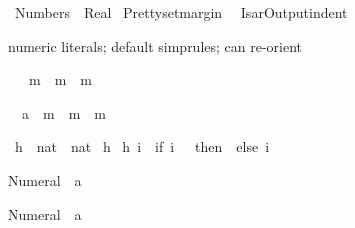 %
\begin{isabellebody}%
\def\isabellecontext{Numbers}%
\isanewline
{}\ Numbers\ {\isacharequal}\ Real{\isacharcolon}\isanewline
\isanewline
\isamarkupfalse%
\ {\isachardoublequote}Pretty{\isachardot}setmargin\ {}{}{\isachardoublequote}\isanewline
\isamarkupfalse%
\ {\isachardoublequote}IsarOutput{\isachardot}indent\ {\isacharcolon}{\isacharequal}\ {}{\isachardoublequote}\isamarkupfalse%
%
\begin{isamarkuptext}%
numeric literals; default simprules; can re-orient%
\end{isamarkuptext}%
\isamarkuptrue%
\ {\isachardoublequote}{}\ {\isacharasterisk}\ m\ {\isacharequal}\ m\ {\isacharplus}\ m{\isachardoublequote}\isamarkupfalse%
%
\begin{isamarkuptxt}%
\begin{isabelle}%
\ {}{\isachardot}\ {\isacharparenleft}{}{\isasymColon}{\isacharprime}a{\isacharparenright}\ {\isacharasterisk}\ m\ {\isacharequal}\ m\ {\isacharplus}\ m%
\end{isabelle}%
\end{isamarkuptxt}%
\isamarkuptrue%
\isanewline
\isanewline
\isamarkupfalse%
\ h\ {\isacharcolon}{\isacharcolon}\ {\isachardoublequote}nat\ {\isasymRightarrow}\ nat{\isachardoublequote}\isanewline
\isamarkupfalse%
\ h\ {\isachardoublequote}{\isacharbraceleft}{\isacharbraceright}{\isachardoublequote}\isanewline
{\isachardoublequote}h\ i\ {\isacharequal}\ {\isacharparenleft}if\ i\ {\isacharequal}\ {}\ then\ {}\ else\ i{\isacharparenright}{\isachardoublequote}\isamarkupfalse%
%
\begin{isamarkuptext}%
%
\end{isamarkuptext}%
\isamarkuptrue%
%
\begin{isamarkuptext}%
\begin{isabelle}%
Numeral{}\ {\isacharequal}\ {\isacharparenleft}{}{\isasymColon}{\isacharprime}a{\isacharparenright}%
\end{isabelle}

\begin{isabelle}%
Numeral{}\ {\isacharequal}\ {\isacharparenleft}{}{\isasymColon}{\isacharprime}a{\isacharparenright}%
\end{isabelle}


\end{isamarkuptext}
\end{isabellebody}
